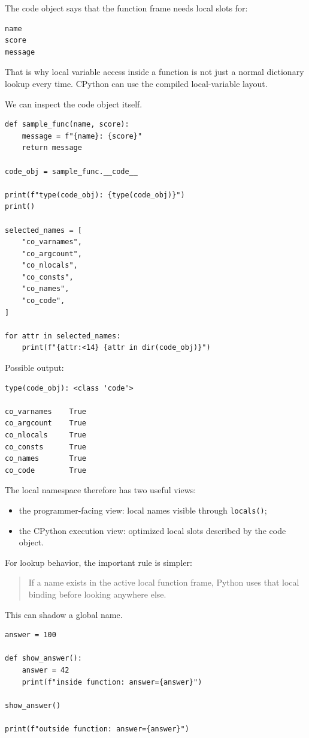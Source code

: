 The code object says that the function frame needs local slots for:

\begin{verbatim}
name
score
message
\end{verbatim}

That is why local variable access inside a function is not just a normal dictionary lookup every time. CPython can use the compiled local-variable layout.

We can inspect the code object itself.

\begin{verbatim}
def sample_func(name, score):
    message = f"{name}: {score}"
    return message

code_obj = sample_func.__code__

print(f"type(code_obj): {type(code_obj)}")
print()

selected_names = [
    "co_varnames",
    "co_argcount",
    "co_nlocals",
    "co_consts",
    "co_names",
    "co_code",
]

for attr in selected_names:
    print(f"{attr:<14} {attr in dir(code_obj)}")
\end{verbatim}

Possible output:

\begin{verbatim}
type(code_obj): <class 'code'>

co_varnames    True
co_argcount    True
co_nlocals     True
co_consts      True
co_names       True
co_code        True
\end{verbatim}

The local namespace therefore has two useful views:

\begin{itemize}
    \item the programmer-facing view: local names visible through \texttt{locals()};
    \item the CPython execution view: optimized local slots described by the code object.
\end{itemize}

For lookup behavior, the important rule is simpler:

\begin{quote}
If a name exists in the active local function frame, Python uses that local binding before looking anywhere else.
\end{quote}

This can shadow a global name.

\begin{verbatim}
answer = 100

def show_answer():
    answer = 42
    print(f"inside function: answer={answer}")

show_answer()

print(f"outside function: answer={answer}")
\end{verbatim}

